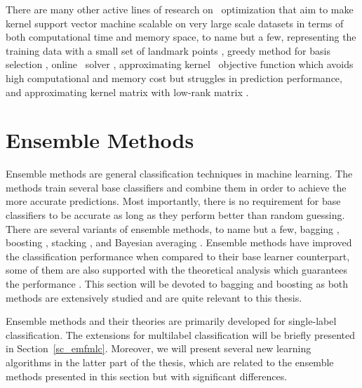 {There are many other active lines of research on \svm\ optimization that aim to make kernel support vector machine scalable on very large scale datasets in terms of both computational time and memory space, to name but a few, representing the training data with a small set of landmark points \citep{Pavlov00towards,Boley04training,Yu05making,Zhang08improved}, greedy method for basis selection \citep{Keerthi06building}, online \svm\ solver \citep{Bordes05fast}, approximating kernel \svm\ objective function \citep{Zhang12scaling, Le13fast} which avoids high computational and memory cost but struggles in prediction performance, and approximating kernel matrix with low-rank matrix \citep{Smola00sparse,Fine02efficient,Drineas05on,Si14memory}.
\fi


%
%
%
\section{Ensemble Methods} \label{sc_em}

Ensemble methods are general classification techniques in machine learning.
The methods train several base classifiers and combine them in order to achieve the more accurate predictions.
Most importantly, there is no requirement for base classifiers to be accurate as long as they perform better than random guessing.
There are several variants of ensemble methods, to name but a few, 
bagging \citep{Breiman96bagging}, 
boosting \citep{Freund97a,Schapire99improved}, 
stacking \citep{Smyth99linearly}, 
and Bayesian averaging \citep{Freund04generalization}.
Ensemble methods have improved the classification performance when compared to their base learner counterpart, some of them are also supported with the theoretical analysis which guarantees the performance \citep{Schapire97boosting,Koltchinskii00empirical,Cortes14semble,Cortes14deep}.
This section will be devoted to bagging and boosting as both methods are extensively studied and are quite relevant to this thesis.

Ensemble methods and their theories are primarily developed for single-label classification.
The extensions for multilabel classification will be briefly presented in Section~\ref{sc_emfmlc}.
Moreover, we will present several new learning algorithms in the latter part of the thesis, which are related to the ensemble methods presented in this section but with significant differences.



}
